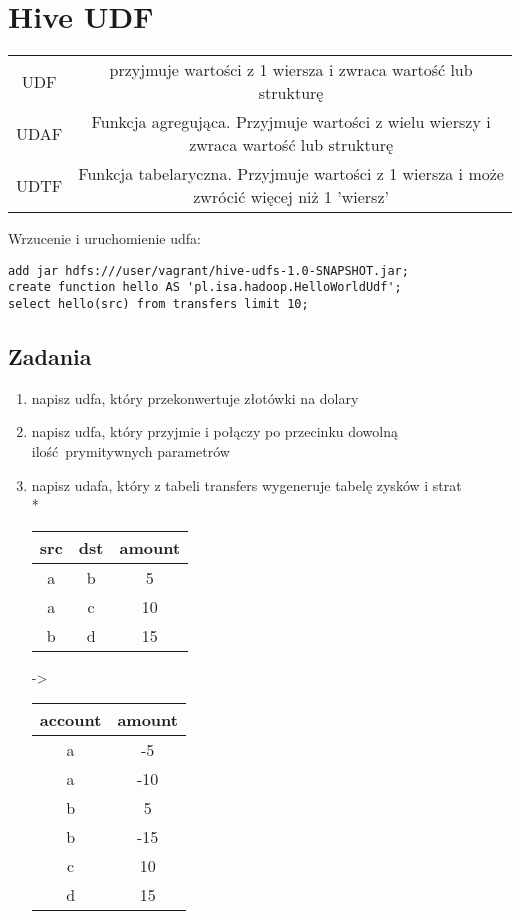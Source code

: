\documentclass{article}
\begin{document}
\section*{Hive UDF}

\begin{tabular}{c | c }
	UDF & przyjmuje wartości z 1 wiersza i zwraca wartość lub strukturę \\
	UDAF & Funkcja agregująca. Przyjmuje wartości z wielu wierszy i zwraca wartość lub strukturę \\
	UDTF & Funkcja tabelaryczna. Przyjmuje wartości z 1 wiersza i może zwrócić więcej niż 1 'wiersz' \\
\end{tabular}

\bigskip


Wrzucenie i uruchomienie udfa:
\begin{lstlisting}
add jar hdfs:///user/vagrant/hive-udfs-1.0-SNAPSHOT.jar;
create function hello AS 'pl.isa.hadoop.HelloWorldUdf';
select hello(src) from transfers limit 10;
\end{lstlisting}

\subsection*{Zadania}

\begin{enumerate}
\item napisz udfa, który przekonwertuje złotówki na dolary
\item napisz udfa, który przyjmie i połączy po przecinku dowolną ilość prymitywnych parametrów
\item napisz udafa, który z tabeli transfers wygeneruje tabelę zysków i strat
\\*
\begin{tabular}{c | c | c }
	src & dst & amount \\ \hline 
	a & b & 5 \\
	a & c & 10 \\
	b & d & 15 \\
\end{tabular}
->
\begin{tabular}{c | c}
	account & amount \\ \hline 
	a & -5 \\
	a & -10 \\
	b & 5 \\
	b & -15 \\
	c & 10 \\
	d & 15 \\
\end{tabular}
\end{enumerate}
\end{document}
